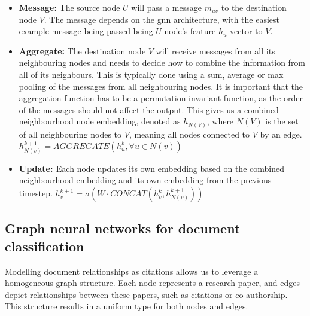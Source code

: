\documentclass[10pt,oneside]{book}
\begin{document}
\begin{tcolorbox}[title=Message Passing Neural Networks in \glspl*{gnn}]
    \begin{itemize}
        \item {\bf{Message:}} The source node $U$ will pass a message $m_{uv}$ to the destination node $V$. The message depends on the \gls*{gnn} architecture, with the easiest example message being passed being $U$ node's feature $h_u$ vector to $V$.
        \item {\bf{Aggregate:}} The destination node $V$ will receive messages from all its neighbouring nodes and needs to decide how to combine the information from all of its neighbours. This is typically done using a sum, average or max pooling of the messages from all neighbouring nodes. It is important that the aggregation function has to be a permutation invariant function, as the order of the messages should not affect the output. This gives us a combined neighbourhood node embedding, denoted as $h_{N(V)}$, where $N(V)$ is the set of all neighbouring nodes to $V$, meaning all nodes connected to $V$ by an edge. $h_{N(v)}^{k+1} = AGGREGATE({h_u^k, \forall u \in N(v)})$
        \item {\bf{Update: }} Each node updates its own embedding based on the combined neighbourhood embedding and its own embedding from the previous timestep. $h_v^{k+1} = \sigma(W \cdot CONCAT(h_v^k, h_{N(v)}^{k+1}))$
    \end{itemize}

\end{tcolorbox}

\subsection{Graph neural networks for document classification}

Modelling document relationships as citations allows us to leverage a homogeneous graph structure. Each node represents a research paper, and edges depict relationships between these papers, such as citations or co-authorship. This structure results in a uniform type for both nodes and edges.
\end{document}
